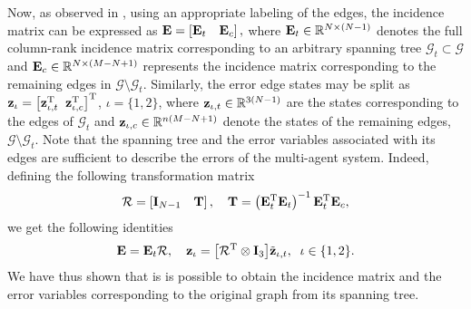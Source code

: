 Now, as observed in \cite{restrepo_edge-directed_2020}, using an appropriate labeling of the edges, the incidence matrix can be expressed as $\mathbf{E} = \left[\mathbf{E}_t\quad \mathbf{E}_c\right],$
where $\mathbf{E}_t\in\mathbb{R}^{N\times(N-1)}$ denotes the full column-rank incidence matrix corresponding to an arbitrary spanning tree $\mathcal G_t \subset \mathcal G$ and $\mathbf{E}_c \in \mathbb{R}^{N\times(M-N+1)}$ represents the incidence matrix corresponding to the remaining edges in $\mathcal G \setminus \mathcal G_t$.
Similarly, the error edge states may be split as $\mathbf{z}_\iota=\left[\mathbf{z}_{\iota, t}^{\mathrm{T}}\;\;\mathbf{z}_{\iota, c}^{\mathrm{T}}\right]^{\mathrm{T}}$, $\iota=\{1,2\}$, where $\mathbf{z}_{\iota, t}\in\mathbb{R}^{3(N-1)}$ are the states corresponding to the edges of $\mathcal G_t$ and $\mathbf{z}_{\iota, c} \in \mathbb{R}^{n(M-N+1)}$ denote the states of the remaining edges, $\mathcal G \setminus \mathcal G_t$.
Note that the spanning tree and the error variables associated with its edges are sufficient to describe the errors of the multi-agent system.
Indeed, defining the following transformation matrix
\begin{equation}\label{n205}
\mathcal{R} = \left[\mathbf{I}_{N-1}\quad \mathbf{T}\right], \quad \mathbf{T}=\left(\mathbf{E}_t^{\mathrm{T}} \mathbf{E}_t\right)^{-1}\mathbf{E}_t^{\mathrm{T}} \mathbf{E}_c,
\end{equation}
we get the following identities
\begin{equation}\label{n209}
\mathbf{E} = \mathbf{E}_t \mathcal{R}, \quad \mathbf{z}_{\iota} = \big[\mathcal{R}^{\mathrm{T}}\otimes \mathbf{I}_3\big] \tilde{\mathbf{z}}_{\iota, t}, \;\; \iota\in\{1,2\}.
\end{equation}
We have thus shown that is is possible to obtain the incidence matrix and the error variables corresponding to the original graph from its spanning tree.

